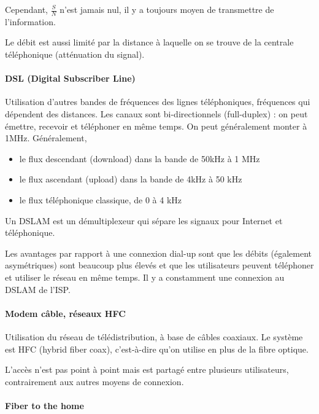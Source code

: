 Cependant, $\frac{S}{N}$ n'est jamais nul, il y a toujours moyen de transmettre de l'information.

Le débit est aussi limité par la distance à laquelle on se trouve de la centrale téléphonique (atténuation du signal).

\paragraph{DSL (Digital Subscriber Line)}

Utilisation d'autres bandes de fréquences des lignes téléphoniques, fréquences qui dépendent des distances. Les canaux sont bi-directionnels (full-duplex) : on peut émettre, recevoir et téléphoner en même temps. On peut généralement monter à 1MHz. Généralement,

\begin{itemize}
	\item le flux descendant (download) dans la bande de 50kHz à 1 MHz
	\item le flux ascendant (upload) dans la bande de 4kHz à 50 kHz
	\item le flux téléphonique classique, de 0 à 4 kHz
\end{itemize}

Un DSLAM est un démultiplexeur qui sépare les signaux pour Internet et téléphonique.

Les avantages par rapport à une connexion dial-up sont que les débits (également asymétriques) sont beaucoup plus élevés et que les utilisateurs peuvent téléphoner et utiliser le réseau en même temps. Il y a constamment une connexion au DSLAM de l'ISP.

\paragraph{Modem câble, réseaux HFC}

Utilisation du réseau de télédistribution, à base de câbles coaxiaux. Le système est HFC (hybrid fiber coax), c'est-à-dire qu'on utilise en plus de la fibre optique.


L'accès n'est pas point à point mais est partagé entre plusieurs utilisateurs, contrairement aux autres moyens de connexion.

\paragraph{Fiber to the home}

